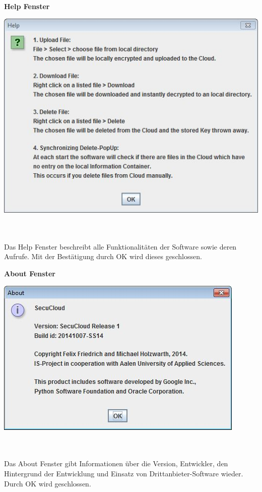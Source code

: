\documentclass[12pt,a4paper,bibliography=totocnumbered,listof=totocnumbered]{scrartcl}
\begin{document}
\textbf{Help Fenster}
\vspace{1em}
$\;$\\
\begin{minipage}{\linewidth}
	\centering
	\includegraphics[width=0.4\linewidth]{HelpPopUp.jpg}
	\label{HelpPopUp}
\end{minipage}
\\\\Das Help Fenster beschreibt alle Funktionalitäten der Software sowie deren Aufrufe. Mit der Bestätigung durch OK wird dieses  geschlossen.

\textbf{About Fenster}
\vspace{1em}
$\;$\\
\begin{minipage}{\linewidth}
	\centering
	\includegraphics[width=0.4\linewidth]{AboutPopUp.jpg}
	\label{AboutPopUp}
\end{minipage}
\\\\Das About Fenster gibt Informationen über die Version, Entwickler, den Hintergrund der Entwicklung und Einsatz von Drittanbieter-Software wieder. Durch OK wird geschlossen.
\end{document}
